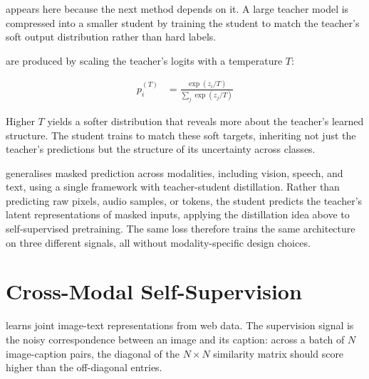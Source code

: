 \vspace{1.5em}
\cite{HintonDistillation2015} appears here because the next method depends on it. A large teacher model is compressed into a smaller student by training the student to match the teacher's soft output distribution rather than hard labels.


 are produced by scaling the teacher's logits with a temperature $T$:

\begin{align*}
    p_i^{(T)} &= \frac{\exp(z_i / T)}{\sum_j \exp(z_j / T)}
\end{align*}

Higher $T$ yields a softer distribution that reveals more about the teacher's learned structure. The student trains to match these soft targets, inheriting not just the teacher's predictions but the structure of its uncertainty across classes.

\vspace{1.0em}
\cite{Baevski2022Data2Vec} generalises masked prediction across modalities, including vision, speech, and text, using a single framework with teacher-student distillation. Rather than predicting raw pixels, audio samples, or tokens, the student predicts the teacher's latent representations of masked inputs, applying the distillation idea above to self-supervised pretraining. The same loss therefore trains the same architecture on three different signals, all without modality-specific design choices.


\section{Cross-Modal Self-Supervision}


\cite{Radford2021CLIP} learns joint image-text representations from web data. The supervision signal is the noisy correspondence between an image and its caption: across a batch of $N$ image-caption pairs, the diagonal of the $N{\times}N$ similarity matrix should score higher than the off-diagonal entries.

